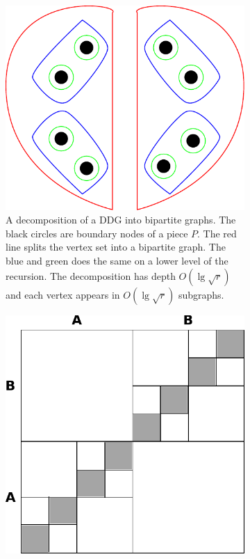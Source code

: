 \begin{figure}
  \centering
  \begin{subfigure}[b]{0.45\textwidth}
    \includegraphics[width=\textwidth]{figs/mongesubgraph.pdf}
    \caption{A decomposition of a DDG into bipartite graphs. The black circles are
    boundary nodes of a piece $P$. The red line splits the vertex set into a bipartite
  graph. The blue and green does the same on a lower level of the recursion. The
decomposition has depth $O(\lg \sqrt{r})$ and each vertex appears in $O(\lg \sqrt{r})$
subgraphs.}
    \label{mongesubgraph}
  \end{subfigure}
  \quad
  \begin{subfigure}[b]{0.45\textwidth}
    \includegraphics[width=\textwidth]{figs/mongematrix.pdf}

\end{subfigure}
\end{figure}
